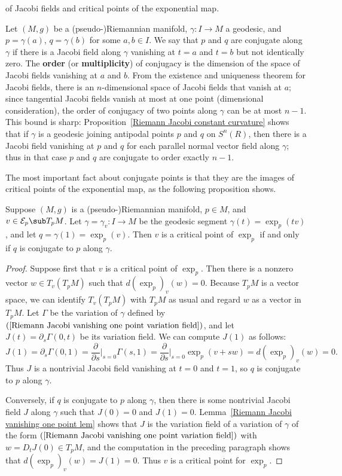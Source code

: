 of Jacobi fields and critical points of the exponential map.\par
Let $(M,g)$ be a (pseudo-)Riemannian manifold, $\gamma:I\to M$ a geodesic, and $p=\gamma(a)$, $q=\gamma(b)$ for some $a,b\in I$. We say that $p$ and $q$ are 
conjugate along $\gamma$ if there is a Jacobi field along $\gamma$ vanishing at $t=a$ and $t=b$ but not identically zero. The \textbf{order} (or \textbf{multiplicity}) 
of conjugacy is the dimension of the space of Jacobi fields vanishing at $a$ and $b$. From the existence and uniqueness theorem for Jacobi fields, there is an 
$n$-dimensional space of Jacobi fields that vanish at $a$; since tangential Jacobi fields vanish at most at one point (dimensional consideration), the order of 
conjugacy of two points along $\gamma$ can be at most $n-1$. This bound is sharp: Proposition~\ref{Riemann Jacobi constant curvature} shows that if $\gamma$ is a 
geodesic joining antipodal points $p$ and $q$ on $S^n(R)$, then there is a Jacobi field vanishing at $p$ and $q$ for each parallel normal vector field along $\gamma$; 
thus in that case $p$ and $q$ are conjugate to order exactly $n-1$.\par
The most important fact about conjugate points is that they are the images of critical points of the exponential map, as the following proposition shows.
\begin{proposition}\label{Riemann conjugate point iff critical exp}
Suppose $(M,g)$ is a (pseudo-)Riemannian manifold, $p\in M$, and $v\in\mathcal{E}_p\sub T_pM$. Let $\gamma=\gamma_v:I\to M$ be the geodesic segment 
$\gamma(t)=\exp_p(tv)$, and let $q=\gamma(1)=\exp_p(v)$. Then $v$ is a critical point of $\exp_p$ if and only if $q$ is conjugate to $p$ along $\gamma$.
\end{proposition}
\begin{proof}
Suppose first that $v$ is a critical point of $\exp_p$. Then there is a nonzero vector $w\in T_v(T_pM)$ such that $d(\exp_p)_{v}(w)=0$. Because $T_pM$ is a vector space, 
we can identify $T_v(T_pM)$ with $T_pM$ as usual and regard $w$ as a vector in $T_pM$. Let $\Gamma$ be the variation of $\gamma$ defined by 
$(\ref{Riemann Jacobi vanishing one point variation field})$, and let $J(t)=\partial_s\Gamma(0,t)$ be its variation field. We can compute $J(1)$ as follows:
\[J(1)=\partial_s\Gamma(0,1)=\frac{\partial}{\partial s}\Big|_{s=0}\Gamma(s,1)=\frac{\partial}{\partial s}\Big|_{s=0}\exp_p(v+sw)=d(\exp_p)_v(w)=0.\]
Thus $J$ is a nontrivial Jacobi field vanishing at $t=0$ and $t=1$, so $q$ is conjugate to $p$ along $\gamma$.\par
Conversely, if $q$ is conjugate to $p$ along $\gamma$, then there is some nontrivial Jacobi field $J$ along $\gamma$ such that $J(0)=0$ and $J(1)=0$. Lemma~\ref{Riemann Jacobi vanishing one point lem} 
shows that $J$ is the variation field of a variation of $\gamma$ of the form $(\ref{Riemann Jacobi vanishing one point variation field})$ with $w=D_tJ(0)\in T_pM$, and 
the computation in the preceding paragraph shows that $d(\exp_p)_v(w)=J(1)=0$. Thus $v$ is a critical point for $\exp_p$.
\end{proof}
